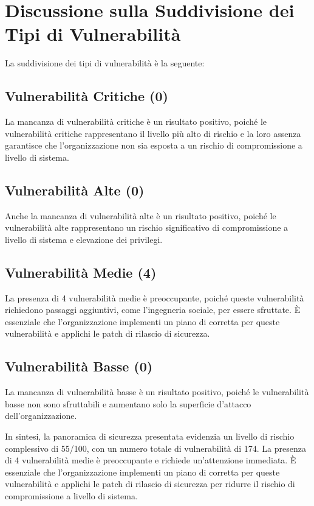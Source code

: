 \section{Discussione sulla Suddivisione dei Tipi di Vulnerabilità}

La suddivisione dei tipi di vulnerabilità è la seguente:

\subsection{Vulnerabilità Critiche (0)}

La mancanza di vulnerabilità critiche è un risultato positivo, poiché le vulnerabilità critiche rappresentano il livello più alto di rischio e la loro assenza garantisce che l'organizzazione non sia esposta a un rischio di compromissione a livello di sistema.

\subsection{Vulnerabilità Alte (0)}

Anche la mancanza di vulnerabilità alte è un risultato positivo, poiché le vulnerabilità alte rappresentano un rischio significativo di compromissione a livello di sistema e elevazione dei privilegi.

\subsection{Vulnerabilità Medie (4)}

La presenza di 4 vulnerabilità medie è preoccupante, poiché queste vulnerabilità richiedono passaggi aggiuntivi, come l'ingegneria sociale, per essere sfruttate. È essenziale che l'organizzazione implementi un piano di corretta per queste vulnerabilità e applichi le patch di rilascio di sicurezza.

\subsection{Vulnerabilità Basse (0)}

La mancanza di vulnerabilità basse è un risultato positivo, poiché le vulnerabilità basse non sono sfruttabili e aumentano solo la superficie d'attacco dell'organizzazione.

In sintesi, la panoramica di sicurezza presentata evidenzia un livello di rischio complessivo di 55/100, con un numero totale di vulnerabilità di 174. La presenza di 4 vulnerabilità medie è preoccupante e richiede un'attenzione immediata. È essenziale che l'organizzazione implementi un piano di corretta per queste vulnerabilità e applichi le patch di rilascio di sicurezza per ridurre il rischio di compromissione a livello di sistema.

